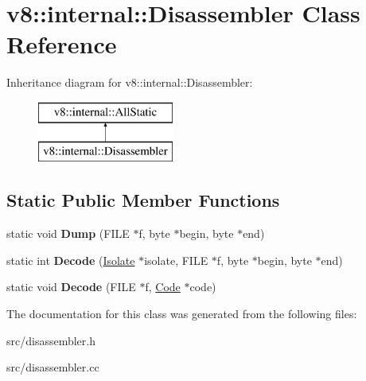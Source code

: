\hypertarget{classv8_1_1internal_1_1_disassembler}{}\section{v8\+:\+:internal\+:\+:Disassembler Class Reference}
\label{classv8_1_1internal_1_1_disassembler}
Inheritance diagram for v8\+:\+:internal\+:\+:Disassembler\+:\begin{figure}[H]
\begin{center}
\leavevmode
\includegraphics[height=2.000000cm]{classv8_1_1internal_1_1_disassembler}
\end{center}
\end{figure}
\subsection*{Static Public Member Functions}
\begin{DoxyCompactItemize}
\item 
\hypertarget{classv8_1_1internal_1_1_disassembler_af698f3e8cf69521b9db72caa8c40c577}{}static void {\bfseries Dump} (F\+I\+L\+E $\ast$f, byte $\ast$begin, byte $\ast$end)\label{classv8_1_1internal_1_1_disassembler_af698f3e8cf69521b9db72caa8c40c577}

\item 
\hypertarget{classv8_1_1internal_1_1_disassembler_a4d3c64c0d912cb1e795e7e9dddb4abc3}{}static int {\bfseries Decode} (\hyperlink{classv8_1_1internal_1_1_isolate}{Isolate} $\ast$isolate, F\+I\+L\+E $\ast$f, byte $\ast$begin, byte $\ast$end)\label{classv8_1_1internal_1_1_disassembler_a4d3c64c0d912cb1e795e7e9dddb4abc3}

\item 
\hypertarget{classv8_1_1internal_1_1_disassembler_a15a916d9622861552be12d215f4448eb}{}static void {\bfseries Decode} (F\+I\+L\+E $\ast$f, \hyperlink{classv8_1_1internal_1_1_code}{Code} $\ast$code)\label{classv8_1_1internal_1_1_disassembler_a15a916d9622861552be12d215f4448eb}

\end{DoxyCompactItemize}


The documentation for this class was generated from the following files\+:\begin{DoxyCompactItemize}
\item 
src/disassembler.\+h\item 
src/disassembler.\+cc\end{DoxyCompactItemize}
